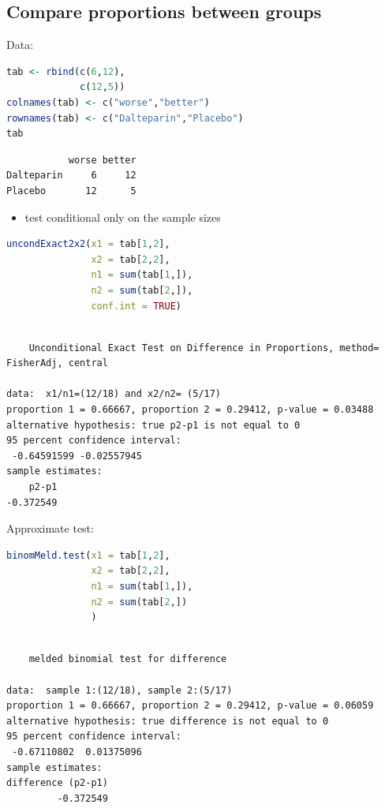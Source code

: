 \documentclass{article}
\begin{document}
\subsection{Compare proportions between groups}
\label{sec:org151db90}

Data:
\begin{lstlisting}[language=r,numbers=none]
tab <- rbind(c(6,12),
             c(12,5))
colnames(tab) <- c("worse","better")
rownames(tab) <- c("Dalteparin","Placebo")
tab
\end{lstlisting}

\label{}
\begin{verbatim}
           worse better
Dalteparin     6     12
Placebo       12      5
\end{verbatim}


\bigskip

\begin{itemize}
\item test conditional only on the sample sizes
\end{itemize}
\begin{lstlisting}[language=r,numbers=none]
uncondExact2x2(x1 = tab[1,2],
               x2 = tab[2,2],
               n1 = sum(tab[1,]),
               n2 = sum(tab[2,]),
               conf.int = TRUE)
\end{lstlisting}

\label{}
\begin{verbatim}

	Unconditional Exact Test on Difference in Proportions, method= FisherAdj, central

data:  x1/n1=(12/18) and x2/n2= (5/17)
proportion 1 = 0.66667, proportion 2 = 0.29412, p-value = 0.03488
alternative hypothesis: true p2-p1 is not equal to 0
95 percent confidence interval:
 -0.64591599 -0.02557945
sample estimates:
    p2-p1 
-0.372549
\end{verbatim}

Approximate test:
\begin{lstlisting}[language=r,numbers=none]
binomMeld.test(x1 = tab[1,2],
               x2 = tab[2,2],
               n1 = sum(tab[1,]),
               n2 = sum(tab[2,])
               )
\end{lstlisting}

\label{}
\begin{verbatim}

	melded binomial test for difference

data:  sample 1:(12/18), sample 2:(5/17)
proportion 1 = 0.66667, proportion 2 = 0.29412, p-value = 0.06059
alternative hypothesis: true difference is not equal to 0
95 percent confidence interval:
 -0.67110802  0.01375096
sample estimates:
difference (p2-p1) 
         -0.372549
\end{verbatim}
\end{document}
